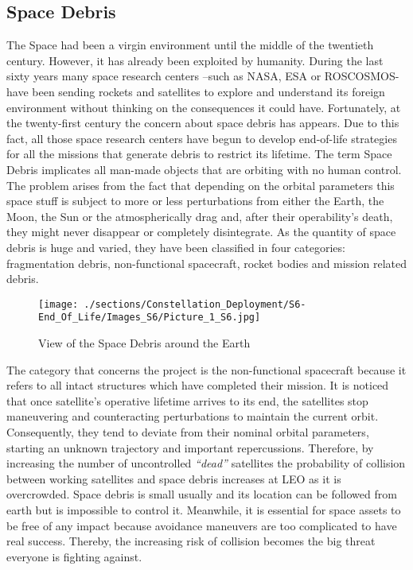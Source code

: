 \subsection{Space Debris}
The Space had been a virgin environment until the middle of the twentieth century. However, it has already been exploited by humanity. During the last sixty years many space research centers –such as NASA, ESA or ROSCOSMOS- have been sending rockets and satellites to explore and understand its foreign environment without thinking on the consequences it could have. Fortunately, at the twenty-first century the concern about space debris has appears. Due to this fact, all those space research centers have begun to develop end-of-life strategies for all the missions that generate debris to restrict its lifetime. 
\newline
\newline
The term Space Debris implicates all man-made objects that are orbiting with no human control. The problem arises from the fact that depending on the orbital parameters this space stuff is subject to more or less perturbations from either the Earth, the Moon, the Sun or the atmospherically drag and, after their operability’s death, they might never disappear or completely disintegrate. As the quantity of space debris is huge and varied, they have been classified in four categories: fragmentation debris, non-functional spacecraft, rocket bodies and mission related debris. 
\newline
\newline
\begin{figure}
\centering 
\texttt{[image: ./sections/Constellation\_Deployment/S6-End\_Of\_Life/Images\_S6/Picture\_1\_S6.jpg]} 
\caption{View of the Space Debris around the Earth}
\end{figure}
\newline
\newline
The category that concerns the project is the non-functional spacecraft because it refers to all intact structures which have completed their mission. It is noticed that once satellite’s operative lifetime arrives to its end, the satellites stop maneuvering and counteracting perturbations to maintain the current orbit. Consequently, they tend to deviate from their nominal orbital parameters, starting an unknown trajectory and important repercussions. 
\newline
\newline
Therefore, by increasing the number of uncontrolled \textit{``dead''} satellites the probability of collision between working satellites and space debris increases at LEO as it is overcrowded. Space debris is small usually and its location can be followed from earth but is impossible to control it. Meanwhile, it is essential for space assets to be free of any impact because avoidance maneuvers are too complicated to have real success.  Thereby, the increasing risk of collision becomes the big threat everyone is fighting against. 

